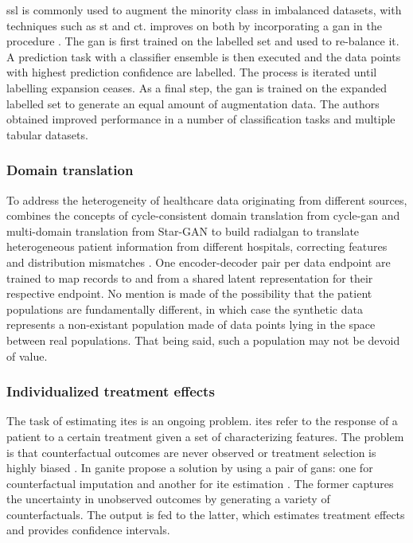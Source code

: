             
            \Gls{ssl} is commonly used to augment the minority class in imbalanced datasets, with techniques such as \gls{st} and \gls{ct}. \citeauthor{yang2018unpaired} improves on both by incorporating a \gls{gan} in the procedure \cite{yang2018unpaired}. The \gls{gan} is first trained on the labelled set and used to re-balance it. A prediction task with a classifier ensemble is then executed and the data points with highest prediction confidence are labelled. The process is iterated until labelling expansion ceases. As a final step, the \gls{gan} is trained on the expanded labelled set to generate an equal amount of augmentation data. The authors obtained improved performance in a number of classification tasks and multiple tabular datasets.
    
    \subsubsection{Domain translation}
    
        To address the heterogeneity of healthcare data originating from different sources, \citeauthor{Yoon2018-radial} combines the concepts of cycle-consistent domain translation from \gls{cycle-gan} \cite{Zhu_2017} and  multi-domain translation from Star-GAN \cite{choi2017stargan} to build \gls{radialgan} to translate heterogeneous patient information from different hospitals, correcting features and distribution mismatches \cite{Yoon2018-radial}. One encoder-decoder pair per data endpoint are trained to map records to and from a shared latent representation for their respective endpoint. No mention is made of the possibility that the patient populations are fundamentally different, in which case the synthetic data represents a non-existant population made of data points lying in the space between real populations. That being said, such a population may not be devoid of value.   
    
    \subsubsection{Individualized treatment effects}
    
        The task of estimating \glspl{ite} is an ongoing problem. \glspl{ite} refer to the response of a patient to a certain treatment given a set of characterizing features. The problem is that counterfactual outcomes are never observed or treatment selection is highly biased \cite{Yoon2018-ite, mcdermott2018semi, walsh2020generating}. In \gls{ganite} \citeauthor{Yoon2018-ite} propose a solution by using a pair of \glspl{gan}: one for counterfactual imputation and another for \gls{ite} estimation \cite{Yoon2018-ite}. The former captures the uncertainty in unobserved outcomes by generating a variety of counterfactuals. The output is fed to the latter, which estimates treatment effects and provides confidence intervals.\par
    
